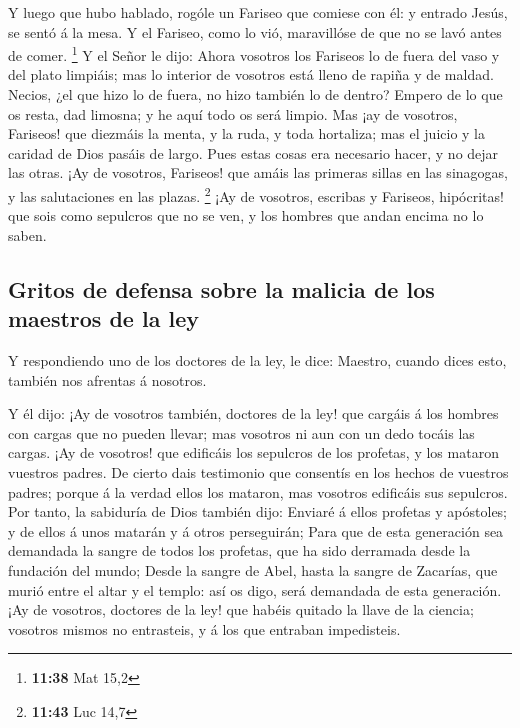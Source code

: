  Y luego que hubo hablado, rogóle un Fariseo que comiese
con él: y entrado Jesús, se sentó á la mesa.  Y el Fariseo,
como lo vió, maravillóse de que no se lavó antes de comer. \footnote{\textbf{11:38}
  Mat 15,2}  Y el Señor le dijo: Ahora vosotros los
Fariseos lo de fuera del vaso y del plato limpiáis; mas lo interior de
vosotros está lleno de rapiña y de maldad.  Necios, ¿el que
hizo lo de fuera, no hizo también lo de dentro?  Empero de
lo que os resta, dad limosna; y he aquí todo os será limpio.
 Mas ¡ay de vosotros, Fariseos! que diezmáis la menta, y la
ruda, y toda hortaliza; mas el juicio y la caridad de Dios pasáis de
largo. Pues estas cosas era necesario hacer, y no dejar las otras.
 ¡Ay de vosotros, Fariseos! que amáis las primeras sillas
en las sinagogas, y las salutaciones en las plazas. \footnote{\textbf{11:43}
  Luc 14,7}  ¡Ay de vosotros, escribas y Fariseos,
hipócritas! que sois como sepulcros que no se ven, y los hombres que
andan encima no lo saben.

\hypertarget{gritos-de-defensa-sobre-la-malicia-de-los-maestros-de-la-ley}{%
\subsection{Gritos de defensa sobre la malicia de los maestros de la
ley}\label{gritos-de-defensa-sobre-la-malicia-de-los-maestros-de-la-ley}}

 Y respondiendo uno de los doctores de la ley, le dice:
Maestro, cuando dices esto, también nos afrentas á nosotros.

 Y él dijo: ¡Ay de vosotros también, doctores de la ley!
que cargáis á los hombres con cargas que no pueden llevar; mas vosotros
ni aun con un dedo tocáis las cargas.  ¡Ay de vosotros! que
edificáis los sepulcros de los profetas, y los mataron vuestros padres.
 De cierto dais testimonio que consentís en los hechos de
vuestros padres; porque á la verdad ellos los mataron, mas vosotros
edificáis sus sepulcros.  Por tanto, la sabiduría de Dios
también dijo: Enviaré á ellos profetas y apóstoles; y de ellos á unos
matarán y á otros perseguirán;  Para que de esta generación
sea demandada la sangre de todos los profetas, que ha sido derramada
desde la fundación del mundo;  Desde la sangre de Abel,
hasta la sangre de Zacarías, que murió entre el altar y el templo: así
os digo, será demandada de esta generación.  ¡Ay de
vosotros, doctores de la ley! que habéis quitado la llave de la ciencia;
vosotros mismos no entrasteis, y á los que entraban impedisteis.

